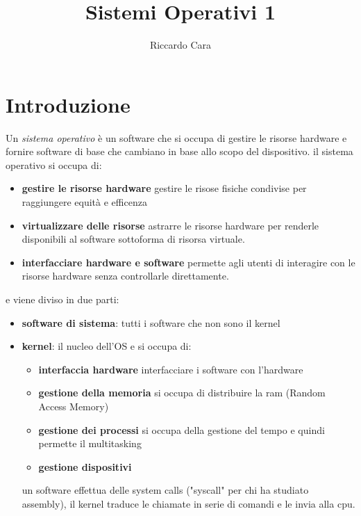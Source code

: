 \documentclass{article}
\title{Sistemi Operativi 1}
\author{Riccardo Cara}
\begin{document}
\maketitle
\tableofcontents
\newpage

\section{Introduzione}

    Un \textit{sistema operativo} è un software che si occupa di gestire le risorse hardware e fornire software di base che cambiano in base allo scopo del dispositivo.
    il sistema operativo si occupa di:

    \begin{itemize}
        \item \textbf{gestire le risorse hardware}
        gestire le risose fisiche condivise per raggiungere equità e efficenza
        \item \textbf{virtualizzare delle risorse}
        astrarre le risorse hardware per renderle disponibili al software sottoforma di risorsa virtuale.
        \item \textbf{interfacciare hardware e software}
        permette agli utenti di interagire con le risorse hardware senza controllarle direttamente.
    \end{itemize}
    e viene diviso in due parti:

    \begin{itemize}
        \item \textbf{software di sistema}:
        tutti i software che non sono il kernel

        \item \textbf{kernel}:
            il nucleo dell'OS e si occupa di:
        
            \begin{itemize}
                \item \textbf{interfaccia hardware}
                interfacciare  i software con l'hardware

                \item \textbf{gestione della memoria}
                si occupa di distribuire la ram (Random Access Memory)
                
                \item \textbf{gestione dei processi}
                si occupa della gestione del tempo e quindi permette il multitasking
                
                \item \textbf{gestione dispositivi}
            \end{itemize}
            un software effettua delle system calls ("syscall" per chi ha studiato assembly), il kernel traduce le chiamate in serie di comandi e le invia alla cpu.
            
        
    \end{itemize}
\end{document}
